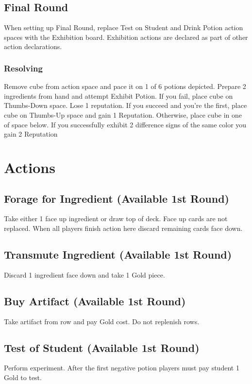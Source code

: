 \documentclass[12pt]{article}
\begin{document}
\begin{multicols*}{2}
\subsection*{Final Round}
When setting up Final Round, replace Test on Student and Drink Potion action spaces with the Exhibition board. Exhibition actions are declared as part of other action declarations.

\subsubsection*{Resolving}
Remove cube from action space and pace it on 1 of 6 potions depicted. Prepare 2 ingredients from hand and attempt Exhibit Potion. If you fail, place cube on Thumbs-Down space. Lose 1 reputation. If you succeed and you're the first, place cube on Thumbs-Up space and gain 1 Reputation. Otherwise, place cube in one of space below. If you successfully exhibit 2 difference signs of the same color you gain 2 Reputation

\section*{Actions}
\subsection*{Forage for Ingredient (Available 1st Round)}
Take either 1 face up ingredient or draw top of deck. Face up cards are not replaced. When all players finish action here discard remaining cards face down.

\subsection*{Transmute Ingredient (Available 1st Round)}
Discard 1 ingredient face down and take 1 Gold piece.

\subsection*{Buy Artifact (Available 1st Round)}
Take artifact from row and pay Gold cost. Do not replenish rows.

\subsection*{Test of Student (Available 1st Round)}
Perform experiment. After the first negative potion players must pay student 1 Gold to test.


\end{multicols*}
\end{document}
